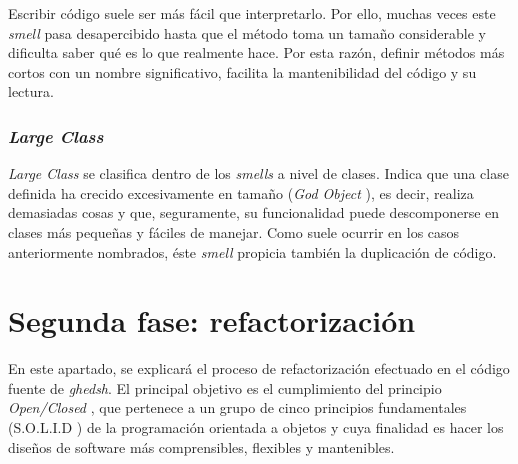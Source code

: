   Escribir código suele ser más fácil que interpretarlo. Por ello, muchas veces este {\it smell} pasa desapercibido hasta que el método toma un tamaño considerable y dificulta saber qué es lo que realmente hace. Por esta razón,
  definir métodos más cortos con un nombre significativo, facilita la mantenibilidad del código y su lectura.
  \bigskip
  \subsubsection{{\it \textbf{Large Class}}}
  {\it Large Class} se clasifica dentro de los {\it smells} a nivel de clases. Indica que una clase definida ha crecido excesivamente en tamaño ({\it God Object} \cite{B12}), es decir, realiza demasiadas cosas y que, seguramente, su funcionalidad puede descomponerse
  en clases más pequeñas y fáciles de manejar. Como suele ocurrir en los casos anteriormente nombrados, éste {\it smell} propicia también la duplicación de código.



  
\section{Segunda fase: refactorización}
\label{2:sec:2}

En este apartado, se explicará el proceso de refactorización efectuado en el código fuente de {\it ghedsh}. El principal objetivo es el cumplimiento del principio {\it Open/Closed} \cite{B13}, que pertenece a un grupo de cinco principios fundamentales (S.O.L.I.D \cite{B14}) de la programación orientada a objetos y cuya finalidad es
hacer los diseños de software más comprensibles, flexibles y mantenibles.
